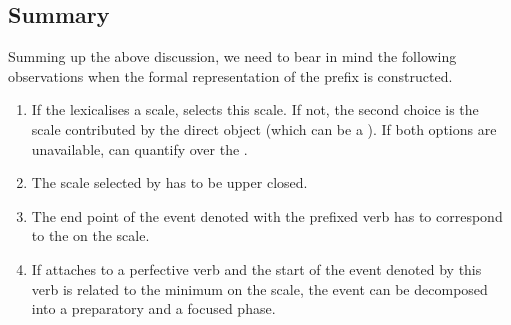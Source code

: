 \subsection{Summary}
Summing up the above discussion, we need to bear in mind the following observations when the formal representation of the prefix  is constructed.
\begin{enumerate}
\item If the  lexicalises a scale,  selects this scale. If not, the second choice is the scale contributed by the direct object (which can be a ). If both options are unavailable,  can quantify over the .
\item The scale selected by  has to be upper closed.
\item The end point of the event denoted with the prefixed verb has to correspond to the  on the scale.
\item If  attaches to a perfective verb and the start of the event denoted by this verb is related to the minimum on the scale, the event can be decomposed into a preparatory and a focused phase.
\end{enumerate}

